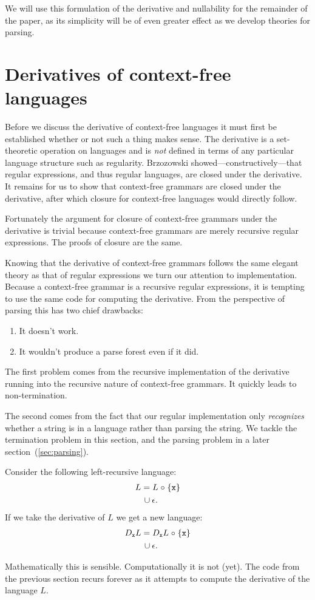 We will use this formulation of the derivative and nullability for the
remainder of the paper, as its simplicity will be of even greater
effect as we develop theories for parsing.

\section{Derivatives of context-free languages}
%
Before we discuss the derivative of context-free languages it must first be
established whether or not such a thing makes sense.
%
The derivative is a set-theoretic operation on languages and is \emph{not}
defined in terms of any particular language structure such as regularity.
%
Brzozowski showed---constructively---that regular expressions, and thus regular
languages, are closed under the derivative.
%
It remains for us to show that context-free grammars are closed under the
derivative, after which closure for context-free languages would directly
follow.
 
Fortunately the argument for closure of context-free grammars under the
derivative is trivial because context-free grammars are merely recursive
regular expressions.
%
The proofs of closure are the same.


Knowing that the derivative of context-free grammars follows the same elegant
theory as that of regular expressions we turn our attention to implementation.
%
Because a context-free grammar is a recursive regular expressions, it is
tempting to use the same code for computing the derivative.
%
From the perspective of parsing this has two chief drawbacks:
\begin{enumerate}
\item It doesn't work.  
\item It wouldn't produce a parse forest even if it did.
\end{enumerate}
The first problem comes from the recursive implementation of the derivative
running into the recursive nature of context-free grammars.
%
It quickly leads to non-termination.

The second comes from the fact that our regular implementation only
\emph{recognizes} whether a string is in a language rather than parsing the
string.
%
We tackle the termination problem in this section, 
and the parsing problem in a later section~(\ref{sec:parsing}).

\begin{example}
Consider the following left-recursive language:
\begin{align*}
  L &=  L \mathrel{\circ} \left\{\tt x\right\} 
  \\
    &\,\cup \epsilon
  \text.
\end{align*}
If we take the derivative of $L$ we get a new language:
\begin{align*}
  D_{\tt x}L &=  D_{\tt x}L \mathrel{\circ} \left\{\tt x\right\} 
  \\
    &\,\cup \epsilon
  \text.
\end{align*}
\end{example}
%
Mathematically this is sensible.
%
Computationally it is not (yet).
%
The code from the previous section recurs forever as it attempts to compute the
derivative of the language $L$.


